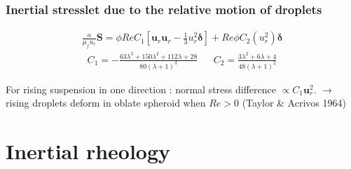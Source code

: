 \documentclass{sintefbeamer}
\begin{document}
\begin{frame}
  \frametitle{Inertial stresslet due to the relative motion of droplets}


  \begin{align*}
    \frac{a}{\mu_f u_r} \bm S
     =
    \phi Re C_1
    [
      \textbf{u}_r\textbf{u}_r - \frac{1}{3}u_r ^2\bm\delta 
      ]
      + Re \phi C_2 (u_r ^2) \bm\delta
  \end{align*} 
\begin{align*}
    C_1  =  -\frac{63 \lambda^{3} + 150 \lambda^{2} + 112 \lambda + 28}{80 \left(\lambda + 1\right)^{3}}
    &&
    C_2  = \frac{3\lambda^2 + 6\lambda + 4}{48(\lambda +1 )^2}
  \end{align*}
  
For rising suspension in one direction : normal stress difference $\propto C_1 \bm u_r^2$.
$\to$ rising droplets deform in oblate spheroid when $Re > 0$ (Taylor \& Acrivos 1964)%


\end{frame}






\section{Inertial rheology}
\section*{}
\end{document}
